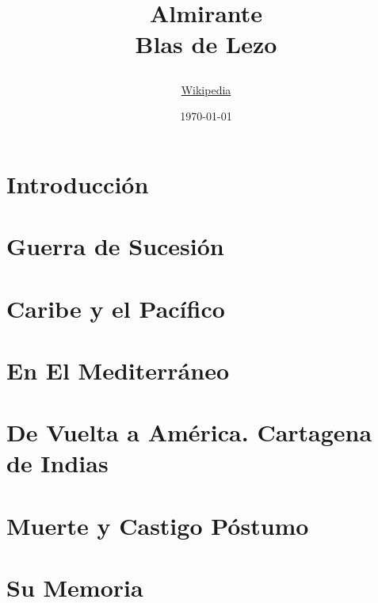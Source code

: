 \documentclass[10pt,
               spanish, %
               twocolumn,
               openright
               ]{report}
\title
{
\HRule
\begin{flushright}
\Large
\textbf{Almirante }\\[4mm]
\huge
\textbf{Blas de Lezo}\\
\end{flushright}
\HRule 
}
\author{\href{https://es.wikipedia.org/wiki/Blas_de_Lezo}{Wikipedia}}
\date{\today}
\begin{document}
\maketitle
\tableofcontents
\listoffigures

\chapter{Introducción}

\chapter{Guerra de Sucesión}

\chapter{Caribe y el Pacífico}

\chapter{En El Mediterráneo}

\chapter{De Vuelta a América. Cartagena de Indias}

\chapter{Muerte y Castigo Póstumo}

\chapter{Su Memoria}


\nocite{alo,arc,ber,fer,mar,qui,rod,smo}



\printindex
\end{document}
